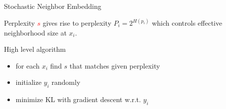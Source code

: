 \documentclass[unknownkeysallowed]{beamer}
\begin{document}
\begin{frame}{Stochastic Neighbor Embedding}

	\begin{block}{Perplexity}
	\textcolor{red}{$s$} gives rise to perplexity $P_i = 2^{H(p_i)}$ which controls effective neighborhood size at $x_i$.
	\end{block}

	\begin{block}{High level algorithm}
	\begin{itemize}
		\item for each $x_i$ find $s$ that matches given perplexity
		\item initialize $y_i$ randomly
		\item minimize KL with gradient descent w.r.t. $y_i$
	\end{itemize}
	\end{block}

\end{frame}
\end{document}
